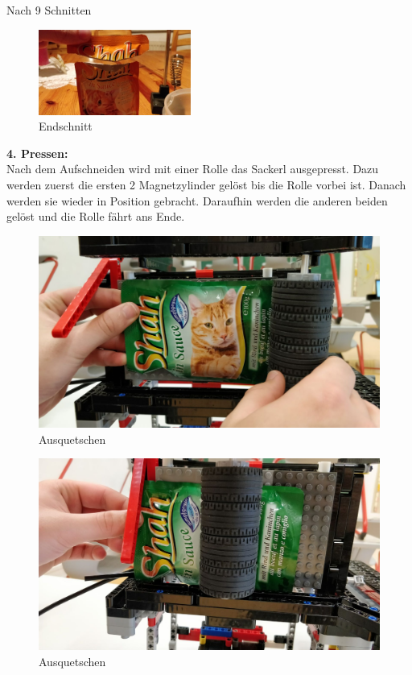 \documentclass[a4paper,12pt]{scrartcl}
\begin{document}
Nach 9 Schnitten

\begin{figure}[H]
\begin{center}
\includegraphics[width=5cm]{Bilder/Schneideversuch_2.Art/Endschnitt}
\caption{Endschnitt}
\end{center}
\end{figure}
\newpage
\textbf{4. Pressen:} \\

Nach dem Aufschneiden wird mit einer Rolle das Sackerl ausgepresst. Dazu werden zuerst die ersten 2 Magnetzylinder gelöst bis die Rolle vorbei ist. Danach werden sie wieder in Position gebracht. Daraufhin werden die anderen beiden gelöst und die Rolle fährt ans Ende.

\begin{figure}[H]
\begin{center}
\includegraphics[width=13cm]{Bilder/Ablauf_1_png/Ausquetschen_1}
\caption{Ausquetschen}
\end{center}
\end{figure}

\begin{figure}[H]
\begin{center}
\includegraphics[width=13cm]{Bilder/Ablauf_1_png/Ausquetschen_2}
\caption{Ausquetschen}
\end{center}
\end{figure}
\end{document}
